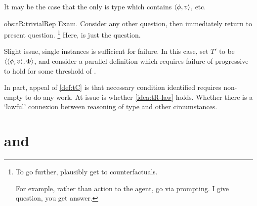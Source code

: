\begin{note}
  \begin{observation}%
    \label{obs:tR:trivialRep}%
    It may be the case that the only \rotoc{} is type which contains \(\langle \phi, v \rangle\), etc.
  \end{observation}

  \begin{motivation}{obs:tR:trivialRep}
    Exam.
    Consider any other question, then immediately return to present question.%
    \footnote{
      To go further, plausibly get to counterfactuals.

      For example, rather than action to the agent, go via prompting.
      I give question, you get answer.
    }
    Here, \tRep{} is just the question.
  \end{motivation}

  Slight issue, single instances is sufficient for failure.
  In this case, set \(T'\) to be \(\langle \langle \phi, v \rangle, \Phi \rangle\), and consider a parallel definition which requires failure of progressive to hold for some threshold of \tI{}.

  In part, appeal of \autoref{def:tC} is that necessary condition identified requires non-empty \tRep{} to do any work.
  At issue is whether \autoref{idea:tR-law} holds.
  Whether there is a `lawful' connexion between reasoning of type and other circumstances.
\end{note}


\section{ and }
\label{cha:typical:tC-fc}

